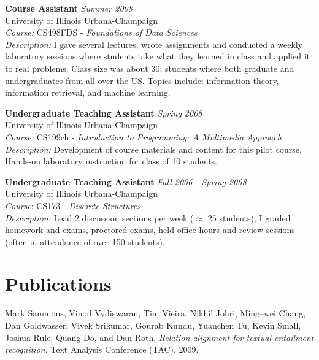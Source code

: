 \documentclass{report}
\begin{document}
{\bf Course Assistant} \hfill {\it Summer 2008} \\
University of Illinois Urbana-Champaign \\
{\sl Course:} CS498FDS - {\sl Foundations of Data Sciences} \\
{\sl Description:} I gave several lectures, wrote assignments and conducted a weekly laboratory sessions where students take what they learned in class and applied it to real problems. Class size was about 30; students where both graduate and undergraduates from all over the US. Topics include: information theory, information retrieval, and machine learning.

{\bf Undergraduate Teaching Assistant} \hfill {\it Spring 2008} \\
University of Illinois Urbana-Champaign \\
{\sl Course:} CS199ch - {\sl Introduction to Programming: A Multimedia             Approach} \\
{\sl Description:} Development of course materials and content for this         pilot course. Hands-on laboratory instruction for class of 10 students.

{\bf Undergraduate Teaching Assistant} \hfill {\it Fall 2006 - Spring 2008} \\
University of Illinois Urbana-Champaign \\
{\sl Course}: CS173 - {\sl Discrete Structures} \\
{\sl Description:} Lead 2 discussion sections per week ($\approx$ 25 students), I graded homework and exams, proctored exams, held office hours and review sessions (often in attendance of over 150 students).



\section*{Publications}

%
%

Mark Sammons, Vinod Vydiswaran, Tim Vieira, Nikhil Johri, Ming--wei Chang,
Dan Goldwasser, Vivek Srikumar, Gourab Kundu, Yuanchen Tu, Kevin Small,
Joshua Rule, Quang Do, and Dan Roth, \emph{Relation alignment for textual entailment recognition}, Text Analysis Conference (TAC), 2009.
\end{document}
